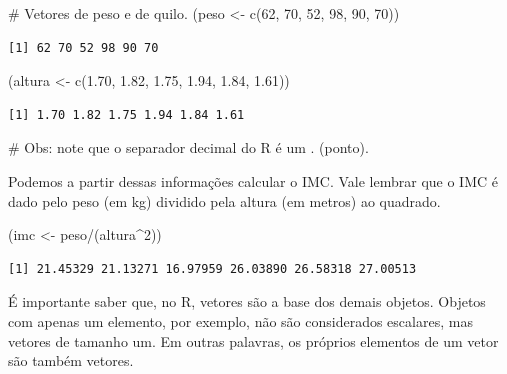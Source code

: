 \documentclass[
  letterpaper,
  DIV=11,
  numbers=noendperiod]{scrreprt}
\newenvironment{Shaded}{\begin{snugshade}}{\end{snugshade}}
\newcommand{\CommentTok}[1]{\textcolor[rgb]{0.37,0.37,0.37}{#1}}
\newcommand{\DecValTok}[1]{\textcolor[rgb]{0.68,0.00,0.00}{#1}}
\newcommand{\FloatTok}[1]{\textcolor[rgb]{0.68,0.00,0.00}{#1}}
\newcommand{\FunctionTok}[1]{\textcolor[rgb]{0.28,0.35,0.67}{#1}}
\newcommand{\NormalTok}[1]{\textcolor[rgb]{0.00,0.23,0.31}{#1}}
\newcommand{\OtherTok}[1]{\textcolor[rgb]{0.00,0.23,0.31}{#1}}
\newcommand{\SpecialCharTok}[1]{\textcolor[rgb]{0.37,0.37,0.37}{#1}}
\begin{document}
\begin{Shaded}
\begin{Highlighting}[]
\CommentTok{\# Vetores de peso e de quilo.}
\NormalTok{(peso }\OtherTok{\textless{}{-}} \FunctionTok{c}\NormalTok{(}\DecValTok{62}\NormalTok{, }\DecValTok{70}\NormalTok{, }\DecValTok{52}\NormalTok{, }\DecValTok{98}\NormalTok{, }\DecValTok{90}\NormalTok{, }\DecValTok{70}\NormalTok{))}
\end{Highlighting}
\end{Shaded}

\begin{verbatim}
[1] 62 70 52 98 90 70
\end{verbatim}

\begin{Shaded}
\begin{Highlighting}[]
\NormalTok{(altura }\OtherTok{\textless{}{-}} \FunctionTok{c}\NormalTok{(}\FloatTok{1.70}\NormalTok{, }\FloatTok{1.82}\NormalTok{, }\FloatTok{1.75}\NormalTok{, }\FloatTok{1.94}\NormalTok{, }\FloatTok{1.84}\NormalTok{, }\FloatTok{1.61}\NormalTok{))}
\end{Highlighting}
\end{Shaded}

\begin{verbatim}
[1] 1.70 1.82 1.75 1.94 1.84 1.61
\end{verbatim}

\begin{Shaded}
\begin{Highlighting}[]
\CommentTok{\# Obs: note que o separador decimal do R é um . (ponto).}
\end{Highlighting}
\end{Shaded}

Podemos a partir dessas informações calcular o IMC. Vale lembrar que o
IMC é dado pelo peso (em kg) dividido pela altura (em metros) ao
quadrado.

\begin{Shaded}
\begin{Highlighting}[]
\NormalTok{(imc }\OtherTok{\textless{}{-}}\NormalTok{ peso}\SpecialCharTok{/}\NormalTok{(altura}\SpecialCharTok{\^{}}\DecValTok{2}\NormalTok{))}
\end{Highlighting}
\end{Shaded}

\begin{verbatim}
[1] 21.45329 21.13271 16.97959 26.03890 26.58318 27.00513
\end{verbatim}

É importante saber que, no R, vetores são a base dos demais objetos.
Objetos com apenas um elemento, por exemplo, não são considerados
escalares, mas vetores de tamanho um. Em outras palavras, os próprios
elementos de um vetor são também vetores.
\end{document}
